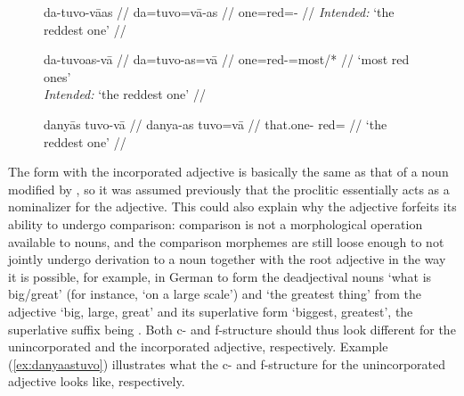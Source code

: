 \begin{figure}
\pex
\a\label{ex:demadjsupl1_2}\ljudge*\begingl
	\gla da-tuvo-vāas //
	\glb da=tuvo=vā-as //
	\glc one=red=\Supl{}-\Parg{} //
	\glft \textit{Intended:} `the reddest one' //
\endgl

\a\label{ex:demadjsupl2_2}\ljudge\excl\begingl
	\gla da-tuvoas-vā //
	\glb da=tuvo-as=vā //
	\glc one=red-\Parg{}=most/*\Supl{} //
	\glft `most red ones' \\
		\textit{Intended:} `the reddest one' //
\endgl

\a\label{ex:demfreeadjsupl}\begingl
	\gla danyās tuvo-vā //
	\glb danya-as tuvo=vā //
	\glc that.one-\Parg{} red=\Supl{} //
	\glft `the reddest one' //
\endgl
\xe
\end{figure}

The form with the incorporated adjective is basically the same as that of a
noun modified by , so it was assumed previously that the
proclitic essentially acts as a nominalizer for the adjective. This could also
explain why the adjective forfeits its ability to undergo comparison:
comparison is not a morphological operation available to nouns, and the
comparison morphemes are still loose enough to not jointly undergo derivation
to a noun together with the root adjective in the way it is possible, for
example, in German to form the deadjectival nouns  `what is
big/great' (for instance,  `on a large scale') and  `the greatest thing' from the adjective  `big, large, great'
and its superlative form  `biggest, greatest', the superlative
suffix being . Both c- and f-structure should thus look different
for the unincorporated and the incorporated adjective, respectively. Example
(\ref{ex:danyaastuvo}) illustrates what the c- and f-structure for the
unincorporated adjective looks like, respectively.


